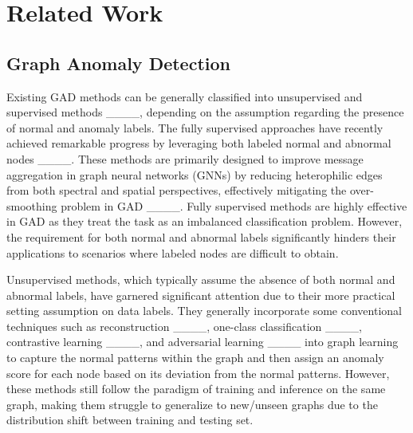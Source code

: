 \section{Related Work}
\subsection{Graph Anomaly Detection} 
Existing GAD methods can be generally classified into unsupervised and supervised methods ____, depending on the assumption regarding the presence of normal and anomaly labels.
The fully supervised approaches have recently achieved remarkable progress by leveraging both labeled normal and abnormal nodes ____. These methods are primarily designed to improve message aggregation in graph neural networks (GNNs) by reducing heterophilic edges from both spectral and spatial perspectives, effectively mitigating the over-smoothing problem in GAD ____. Fully supervised methods are highly effective in GAD as they treat the task as an imbalanced classification problem. However, the requirement for both normal and abnormal labels significantly hinders their applications to scenarios where labeled nodes are difficult to obtain.

Unsupervised methods, which typically assume the absence of both normal and abnormal labels, have garnered significant attention due to their more practical setting assumption on data labels. They generally incorporate some conventional techniques such as reconstruction ____, one-class classification ____, contrastive learning ____, and adversarial learning ____ into graph learning to capture the normal patterns within the graph and then assign an anomaly score for each node based on its deviation from the normal patterns. However, these methods still follow the paradigm of training and inference on the same graph, making them struggle to generalize to new/unseen graphs due to the distribution shift between training and testing set.



